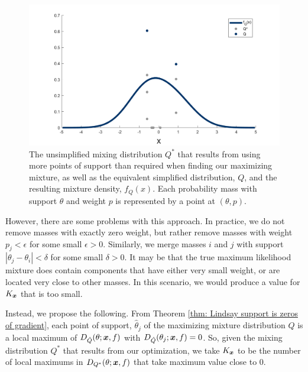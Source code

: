 	\begin{figure}
		\centering
		\includegraphics[width = \textwidth]{Figures/Mixtures/collapsing_distribution.png}
		\caption[The unsimplified mixing distribution $Q^*$ that results from using more points of support than required when finding our maximizing mixture, as well as the equivalent simplified distribution, $Q$, and the resulting mixture density, $f_Q(x)$.]{The unsimplified mixing distribution $Q^*$ that results from using more points of support than required when finding our maximizing mixture, as well as the equivalent simplified distribution, $Q$, and the resulting mixture density, $f_Q(x)$. Each probability mass with support $\theta$ and weight $p$ is represented by a point at $(\theta, p)$.}
		\label{fig:collapsing distribution}
	\end{figure}

	However, there are some problems with this approach. In practice, we do not remove masses with exactly zero weight, but rather remove masses with weight $p_j < \epsilon$ for some small $\epsilon > 0$. Similarly, we merge masses $i$ and $j$ with support $|\theta_j - \theta_i| < \delta$ for some small $\delta > 0$. It may be that the true maximum likelihood mixture does contain components that have either very small weight, or are located very close to other masses. In this scenario, we would produce a value for $K_{\bm{{x}}}$ that is too small.

	Instead, we propose the following. From Theorem \ref{thm: Lindsay support is zeros of gradient}, each point of support, $\hat{\theta}_j$ of the maximizing mixture distribution $\hat{Q}$ is a local maximum of $D_{\hat{Q}}(\theta;{\bm{{x}}}, f)$ with $D_{\hat{Q}}(\theta_j;{\bm{{x}}},f) = 0$. So, given the mixing distribution $Q^*$ that results from our optimization, we take $K_{\bm{{x}}}$ to be the number of local maximums in $D_{Q^*}(\theta;{\bm{{x}}}, f)$ that take maximum value close to $0$.


